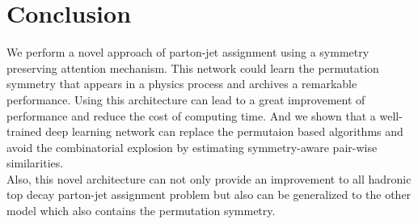 \chapter{Conclusion}

We perform a novel approach of parton-jet assignment using a symmetry preserving attention mechanism. This network could learn the permutation symmetry that appears in a physics process and archives a remarkable performance. Using this architecture can lead to a great improvement of performance and reduce the cost of computing time. And we shown that a well-trained deep learning network can replace the permutaion based algorithms and avoid the combinatorial explosion by estimating symmetry-aware pair-wise similarities.
\\
Also, this novel architecture can not only provide an improvement to all hadronic top decay parton-jet assignment problem but also can be generalized to the other model which also contains the permutation symmetry. 
